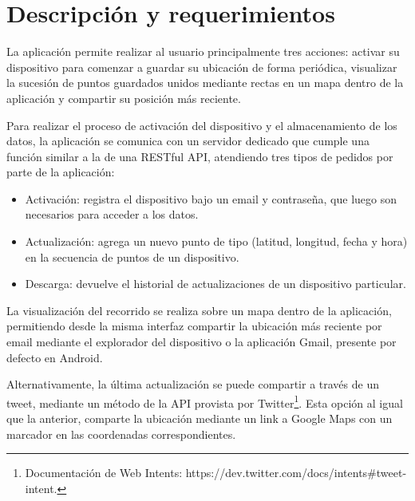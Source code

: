 \documentclass[a4paper]{article}
\begin{document}

\newpage

\tableofcontents

\medskip

\newpage

\section{Descripción y requerimientos}
\vspace*{2mm}
\vspace*{2mm}
\vspace*{2mm}
\vspace*{2mm}

La aplicación permite realizar al usuario principalmente tres acciones: activar su dispositivo para comenzar a guardar su ubicación de forma periódica, visualizar la sucesión de puntos guardados unidos mediante rectas en un mapa dentro de la aplicación y compartir su posición más reciente.
\vspace*{2mm}

Para realizar el proceso de activación del dispositivo y el almacenamiento de los datos, la aplicación se comunica con un servidor dedicado que cumple una función similar a la de una RESTful API, atendiendo tres tipos de pedidos por parte de la aplicación:
\begin{itemize}
  \item Activación: registra el dispositivo bajo un email y contraseña, que luego son necesarios para acceder a los datos.
  \item Actualización: agrega un nuevo punto de tipo (latitud, longitud, fecha y hora) en la secuencia de puntos de un dispositivo.
  \item Descarga: devuelve el historial de actualizaciones de un dispositivo particular.
\end{itemize}
\vspace*{2mm}

La visualización del recorrido se realiza sobre un mapa dentro de la aplicación, permitiendo desde la misma interfaz compartir la ubicación más reciente por email mediante el explorador del dispositivo o la aplicación Gmail, presente por defecto en Android.
\vspace*{2mm}

Alternativamente, la última actualización se puede compartir a través de un tweet, mediante un método de la API provista por Twitter\footnote{Documentación de Web Intents: https://dev.twitter.com/docs/intents\#tweet-intent.}. Esta opción al igual que la anterior, comparte la ubicación mediante un link a Google Maps con un marcador en las coordenadas correspondientes.
\end{document}
